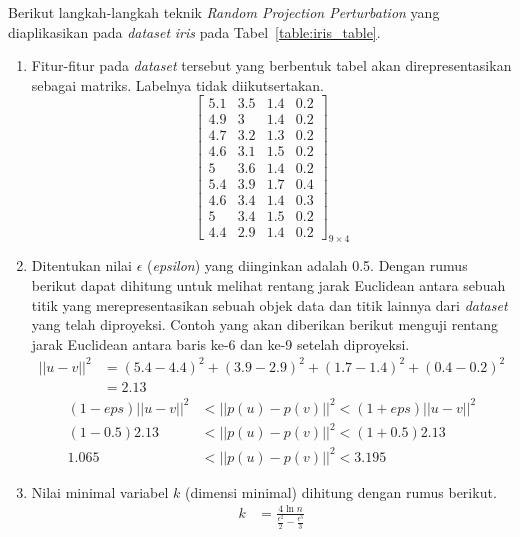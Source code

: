 Berikut langkah-langkah teknik \textit{Random Projection Perturbation} yang diaplikasikan pada \textit{dataset} \textit{iris} pada Tabel~\ref{table:iris_table}.
\begin{enumerate}
    \item Fitur-fitur pada \textit{dataset} tersebut yang berbentuk tabel akan direpresentasikan sebagai matriks. Labelnya tidak diikutsertakan.
    \[
        \begin{bmatrix}
        5.1		&		3.5		&		1.4		&		0.2	\\
        4.9		&		3		&		1.4		&		0.2	\\
        4.7		&		3.2		&		1.3		&		0.2	\\
        4.6		&		3.1		&		1.5		&		0.2	\\
        5		&		3.6		&		1.4		&		0.2	\\
        5.4		&		3.9		&		1.7		&		0.4	\\
        4.6		&		3.4		&		1.4		&		0.3	\\
        5		&		3.4		&		1.5		&		0.2	\\
        4.4		&		2.9		&		1.4		&		0.2 
        \end{bmatrix}_{9\times 4}
    \]
    \item Ditentukan nilai \(\epsilon\) (\textit{epsilon}) yang diinginkan adalah 0.5. Dengan rumus berikut dapat dihitung untuk melihat rentang jarak Euclidean antara sebuah titik yang merepresentasikan sebuah objek data dan titik lainnya dari \textit{dataset} yang telah diproyeksi. Contoh yang akan diberikan berikut menguji rentang jarak Euclidean antara baris ke-6 dan ke-9 setelah diproyeksi.
    \begin{align*}
        ||u - v||^{2} &= (5.4-4.4)^2 + (3.9-2.9)^2 + (1.7-1.4)^2 + (0.4-0.2)^2
        \\
        &= 2.13
    \end{align*}
    \begin{align*}
        (1-eps)||u - v||^{2}&<||p(u) - p(v)||^{2}<(1+eps)||u - v||^{2}
        \\
        (1-0.5)2.13&<||p(u) - p(v)||^{2}<(1+0.5)2.13
        \\
        1.065&<||p(u) - p(v)||^{2}<3.195
    \end{align*}
    \item Nilai minimal variabel \(k\) (dimensi minimal) dihitung dengan rumus berikut.
    \begin{align*}
        k &= \frac{4\ln{n}}{\frac{\epsilon^{2}}{2}-\frac{\epsilon^{3}}{3}} \\

\end{align*}
\end{enumerate}
